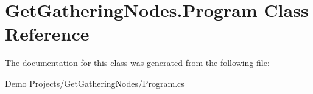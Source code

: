 \hypertarget{class_get_gathering_nodes_1_1_program}{\section{Get\-Gathering\-Nodes.\-Program Class Reference}
\label{class_get_gathering_nodes_1_1_program}
}


The documentation for this class was generated from the following file\-:\begin{DoxyCompactItemize}
\item 
Demo Projects/\-Get\-Gathering\-Nodes/Program.\-cs\end{DoxyCompactItemize}
